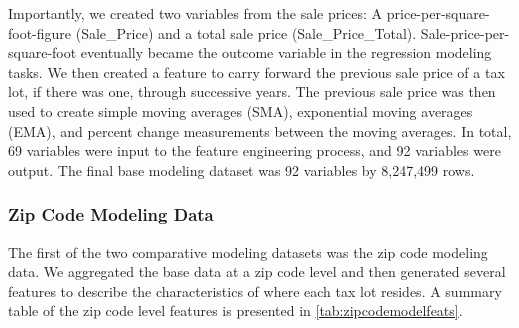 \documentclass[conference,final,]{IEEEtran}
\begin{document}
Importantly, we created two variables from the sale prices: A
price-per-square-foot-figure (Sale\_Price) and a total sale price
(Sale\_Price\_Total). Sale-price-per-square-foot eventually became the
outcome variable in the regression modeling tasks. We then created a
feature to carry forward the previous sale price of a tax lot, if there
was one, through successive years. The previous sale price was then used
to create simple moving averages (SMA), exponential moving averages
(EMA), and percent change measurements between the moving averages. In
total, 69 variables were input to the feature engineering process, and
92 variables were output. The final base modeling dataset was 92
variables by 8,247,499 rows.

\hypertarget{zip-code-modeling-data}{%
\subsubsection{Zip Code Modeling Data}\label{zip-code-modeling-data}}

The first of the two comparative modeling datasets was the zip code
modeling data. We aggregated the base data at a zip code level and then
generated several features to describe the characteristics of where each
tax lot resides. A summary table of the zip code level features is
presented in \ref{tab:zipcodemodelfeats}.
\end{document}
